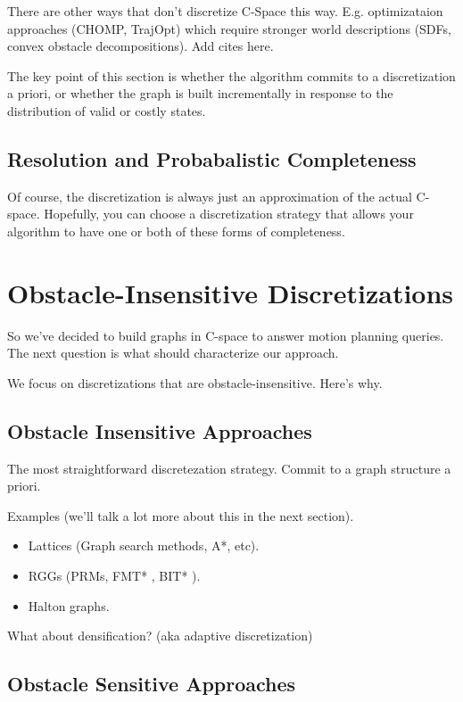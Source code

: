 There are other ways that don't discretize C-Space this way.
E.g. optimizataion approaches (CHOMP, TrajOpt) which require
stronger world descriptions (SDFs, convex obstacle decompositions).
Add cites here.

The key point of this section is whether the algorithm commits to
a discretization a priori,
or whether the graph is built incrementally in response to the
distribution of valid or costly states.

\subsection{Resolution and Probabalistic Completeness}

Of course, the discretization is always just an approximation
of the actual C-space.
Hopefully, you can choose a discretization strategy that allows your
algorithm to have one or both of these forms of completeness.

\section{Obstacle-Insensitive Discretizations}

So we've decided to build graphs in C-space to answer motion planning
queries.
The next question is what should characterize our approach.

We focus on discretizations that are obstacle-insensitive.
Here's why.

\subsection{Obstacle Insensitive Approaches}

The most straightforward discretezation strategy.
Commit to a graph structure a priori.

Examples (we'll talk a lot more about this in the next section).
\begin{itemize}
\item Lattices (Graph search methods, A*, etc).
\item RGGs (PRMs, FMT* \citep{janson2015fmtstar},
   BIT* \citep{gammell2015bitstar}).
\item Halton graphs.
\end{itemize}

What about densification? (aka adaptive discretization)

\subsection{Obstacle Sensitive Approaches}


